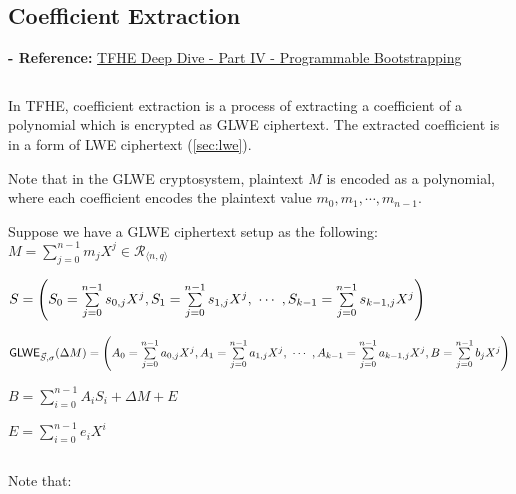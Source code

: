 \subsection{Coefficient Extraction}
\label{subsec:tfhe-extraction}

\textbf{- Reference:} 
\href{https://www.zama.ai/post/tfhe-deep-dive-part-4}{TFHE Deep Dive - Part IV - Programmable Bootstrapping}~\cite{tfhe-4}

$ $

In TFHE, coefficient extraction is a process of extracting a coefficient of a polynomial which is encrypted as GLWE ciphertext. The extracted coefficient is in a form of LWE ciphertext (\autoref{sec:lwe}). %



Note that in the GLWE cryptosystem, plaintext $M$ is encoded as a polynomial, where each coefficient encodes the plaintext value $m_0, m_1, \cdots, m_{n-1}$.


Suppose we have a GLWE ciphertext setup as the following: \\ 
$M = \sum\limits_{j=0}^{n-1}m_jX^j \in \mathcal{R}_{\langle n, q \rangle}$ 

$S = \left(S_0 = \sum\limits_{j=0}^{n-1}s_{0,j}X^j, S_1 = \sum\limits_{j=0}^{n-1}s_{1,j}X^j, \text{ } \text{$\cdots$} \text{ }, S_{k-1} = \sum\limits_{j=0}^{n-1}s_{k-1,j}X^j \right)$ 

$\textsf{GLWE}_{\vec{S}, \sigma}(\Delta M) = \left(A_0 = \sum\limits_{j=0}^{n-1}a_{0,j}X^j, A_1 = \sum\limits_{j=0}^{n-1}a_{1,j}X^j, \text{ } \text{$\cdots$} \text{ }, A_{k-1} = \sum\limits_{j=0}^{n-1}a_{k-1,j}X^j, B = \sum\limits_{j=0}^{n-1}b_{j}X^j\right)$ 

$B = \sum\limits_{i=0}^{n-1}A_iS_i + \Delta M + E$ 

$E = \sum\limits_{i=0}^{n-1}e_iX^i$ 

$ $

\noindent Note that:

